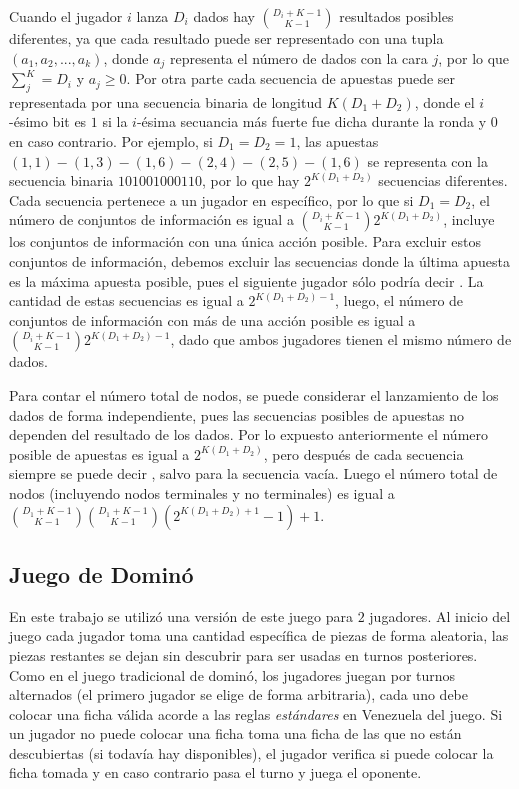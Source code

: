 Cuando el jugador $i$ lanza $D_i$ dados hay $\binom{D_i+K-1}{K-1}$ resultados posibles diferentes, ya que cada resultado puede ser representado con una tupla $(a_1, a_2, ..., a_k)$, donde $a_j$ representa el número de dados con la cara $j$, por lo que $\sum_j^K = D_i$ y $a_j \geq 0$. Por otra parte cada secuencia de apuestas puede ser representada por una secuencia binaria de longitud $K(D_1 + D_2)$, donde el $i$-ésimo bit es $1$ si la $i$-ésima secuancia más fuerte fue dicha durante la ronda y $0$ en caso contrario. Por ejemplo, si $D_1 = D_2 = 1$, las apuestas $(1, 1)-(1, 3)-(1, 6)-(2, 4)-(2, 5)-(1, 6)$ se representa con la secuencia binaria $101001000110$, por lo que hay $2^{K(D_1 + D_2)}$ secuencias diferentes. Cada secuencia pertenece a un jugador en específico, por lo que si $D_1 = D_2$, el número de conjuntos de información  es igual a  $\binom{D_i+K-1}{K-1}2^{K(D_1 + D_2)}$, incluye los conjuntos de información con una única acción posible. Para excluir estos conjuntos de información, debemos excluir las secuencias donde la última apuesta es la máxima apuesta posible, pues el siguiente jugador sólo podría decir . La cantidad de estas secuencias es igual a $2^{K(D_1 + D_2)-1}$, luego, el número de conjuntos de información con más de una acción posible es igual a $\binom{D_i+K-1}{K-1}2^{K(D_1 + D_2)-1}$, dado que ambos jugadores tienen el mismo número de dados.

Para contar el número total de nodos, se puede considerar el lanzamiento de los dados de forma independiente, pues las secuencias posibles de apuestas no dependen del resultado de los dados. Por lo expuesto anteriormente el número posible de apuestas es igual a $2^{K(D_1+D_2)}$, pero después de cada secuencia siempre se puede decir , salvo para la secuencia vacía. Luego el número total de nodos (incluyendo nodos terminales y no terminales) es igual a $\binom{D_1+K-1}{K-1}\binom{D_1+K-1}{K-1}(2^{K(D_1+D_2)+1}-1)+1$.

\subsection*{Juego de Dominó}
En este trabajo se utilizó una versión de este juego para $2$ jugadores. Al inicio del juego cada jugador toma una cantidad específica de piezas de forma aleatoria, las piezas restantes se dejan sin descubrir para ser usadas en turnos posteriores. Como en el juego tradicional de dominó, los jugadores juegan por turnos alternados (el primero jugador se elige de forma arbitraria), cada uno debe colocar una ficha válida acorde a las reglas \textit{estándares} en Venezuela del juego. Si un jugador no puede colocar una ficha toma una ficha de las que no están descubiertas (si todavía hay disponibles), el jugador verifica si puede colocar la ficha tomada y en caso contrario pasa el turno y juega el oponente.


